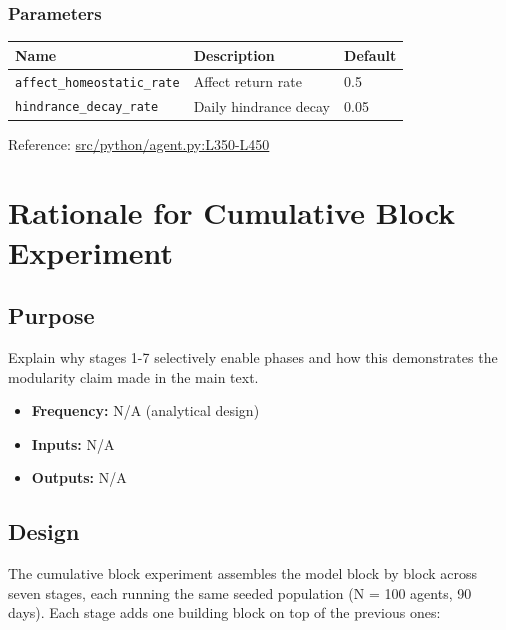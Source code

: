 \documentclass[
  letterpaper,
  DIV=11,
  numbers=noendperiod]{scrartcl}
\providecommand{\tightlist}{%
  \setlength{\itemsep}{0pt}\setlength{\parskip}{0pt}}
\newcommand{\trow}[3]{%
  \texttt{\allowbreak #1} & #2 & #3 \\
}
\begin{document}
\subsubsection{Parameters}\label{parameters-8}

\begin{tabularx}{\textwidth}{p{4.5cm}Xp{2cm}}
\toprule
\textbf{Name} & \textbf{Description} & \textbf{Default} \\
\midrule
\trow{affect\_homeostatic\_rate}{Affect return rate}{0.5}
\trow{hindrance\_decay\_rate}{Daily hindrance decay}{0.05}
\bottomrule
\end{tabularx}

Reference:
\href{https://github.com/namakala/abm-simulation/blob/84ff9b37fb0c569bef9f122e789d9c23a89348ec/src/python/agent.py\#L350-L450}{src/python/agent.py:L350-L450}

\section{Rationale for Cumulative Block
Experiment}\label{rationale-for-cumulative-block-experiment}

\subsection{Purpose}\label{purpose-11}

Explain why stages 1-7 selectively enable phases and how this
demonstrates the modularity claim made in the main text.

\begin{itemize}
\tightlist
\item
  \textbf{Frequency:} N/A (analytical design)
\item
  \textbf{Inputs:} N/A
\item
  \textbf{Outputs:} N/A
\end{itemize}

\subsection{Design}\label{design}

The cumulative block experiment assembles the model block by block
across seven stages, each running the same seeded population (N = 100
agents, 90 days). Each stage adds one building block on top of the
previous ones:
\end{document}
